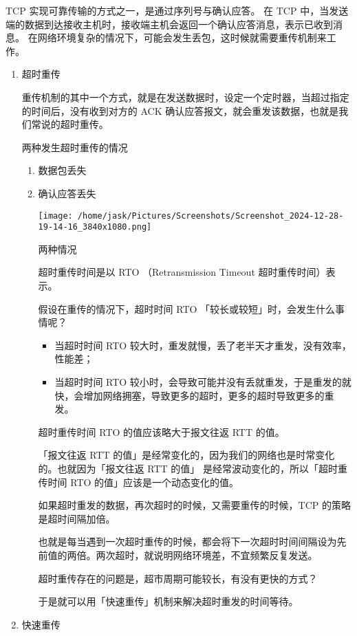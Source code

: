 \documentclass[11pt]{article}
\begin{document}
TCP 实现可靠传输的方式之一，是通过序列号与确认应答。
在 TCP 中，当发送端的数据到达接收主机时，接收端主机会返回一个确认应答消息，表示已收到消息。
在网络环境复杂的情况下，可能会发生丢包，这时候就需要重传机制来工作。
\begin{enumerate}
\item 超时重传
\label{sec:orgaccd4a2}

重传机制的其中一个方式，就是在发送数据时，设定一个定时器，当超过指定的时间后，没有收到对方的 ACK 确认应答报文，就会重发该数据，也就是我们常说的超时重传。

两种发生超时重传的情况

\begin{enumerate}
\item 数据包丢失
\item 确认应答丢失
\begin{center}
\texttt{[image: /home/jask/Pictures/Screenshots/Screenshot\_2024-12-28-19-14-16\_3840x1080.png]}
\end{center}
两种情况

超时重传时间是以 RTO （Retransmission Timeout 超时重传时间）表示。

假设在重传的情况下，超时时间 RTO 「较长或较短」时，会发生什么事情呢？
\begin{itemize}
\item 当超时时间 RTO 较大时，重发就慢，丢了老半天才重发，没有效率，性能差；

\item 当超时时间 RTO 较小时，会导致可能并没有丢就重发，于是重发的就快，会增加网络拥塞，导致更多的超时，更多的超时导致更多的重发。
\end{itemize}

超时重传时间 RTO 的值应该略大于报文往返 RTT 的值。

「报文往返 RTT 的值」是经常变化的，因为我们的网络也是时常变化的。也就因为「报文往返 RTT 的值」 是经常波动变化的，所以「超时重传时间 RTO 的值」应该是一个动态变化的值。

如果超时重发的数据，再次超时的时候，又需要重传的时候，TCP 的策略是超时间隔加倍。

也就是每当遇到一次超时重传的时候，都会将下一次超时时间间隔设为先前值的两倍。两次超时，就说明网络环境差，不宜频繁反复发送。

超时重传存在的问题是，超市周期可能较长，有没有更快的方式？

于是就可以用「快速重传」机制来解决超时重发的时间等待。
\end{enumerate}
\item 快速重传
\label{sec:org4df1582}


\end{enumerate}
\end{document}
